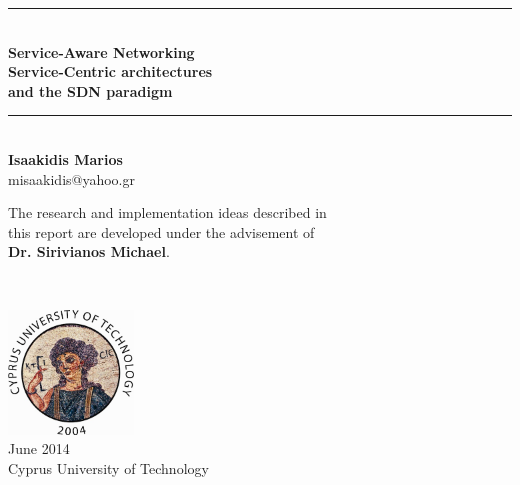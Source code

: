 \begin{titlepage}

\begin{center}

\newcommand{\HRule}{\rule{\linewidth}{0.5mm}}



\HRule \\[0.5cm]
{ \LARGE \bfseries {\huge Service-Aware Networking} \\[0.2cm] Service-Centric architectures\\[0.2cm]and the SDN paradigm}\\[0.5cm]

\HRule \\[1cm]

{\LARGE \bf
Isaakidis Marios\\
}
misaakidis@yahoo.gr

\vfill

{\large
The research and implementation ideas described in\\ this report are developed under the advisement of\\ \textbf{Dr. Sirivianos Michael}.}
\end{center}
 ~\\[1.5cm]
\begin{flushright}
\includegraphics[width=0.25\textwidth]{./cut-logo-2}\\[0.2cm]
{\large
June 2014 \\
Cyprus University of Technology
}
\end{flushright}

\end{titlepage}